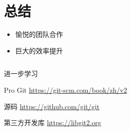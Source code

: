 \section{总结}

\begin{frame}
    \begin{itemize}
        \item 愉悦的团队合作
        \item 巨大的效率提升
    \end{itemize}
    \begin{columns}
    \end{columns}
\end{frame}

\begin{frame}{进一步学习}
    \begin{block}{Pro Git}
        \href{https://git-scm.com/book/zh/v2}{https://git-scm.com/book/zh/v2}
    \end{block}

    \begin{block}{源码}
        \href{https://github.com/git/git}{https://github.com/git/git}
    \end{block}

    \begin{block}{第三方开发库}
        \href{https://libgit2.org}{https://libgit2.org}
    \end{block}
\end{frame}